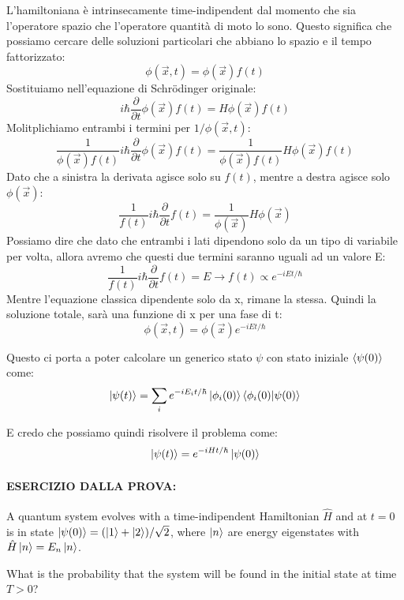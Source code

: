 L'hamiltoniana è intrinsecamente time-indipendent dal momento che sia l'operatore spazio che l'operatore quantità di moto lo sono. Questo significa che possiamo cercare delle soluzioni particolari che abbiano lo spazio e il tempo fattorizzato:
$$\phi(\vec{x}, t) = \phi(\vec{x})f(t)$$
Sostituiamo nell'equazione di Schr\"{o}dinger originale:
$$i\hbar\frac{\partial}{\partial t}\phi(\vec{x})f(t) = H\phi(\vec{x})f(t)$$
Molitplichiamo entrambi i termini per $1 / \phi(\vec{x}, t)$:
$$\frac{1}{\phi(\vec{x})f(t)}i\hbar\frac{\partial}{\partial t}\phi(\vec{x})f(t) = \frac{1}{\phi(\vec{x})f(t)}H\phi(\vec{x})f(t)$$
Dato che a sinistra la derivata agisce solo su $f(t)$, mentre a destra agisce solo $\phi(\vec{x})$:
$$\frac{1}{f(t)}i\hbar\frac{\partial}{\partial t}f(t) = \frac{1}{\phi(\vec{x})}H\phi(\vec{x})$$
Possiamo dire che dato che entrambi i lati dipendono solo da un tipo di variabile per volta, allora avremo che questi due termini saranno uguali ad un valore E:
$$\frac{1}{f(t)}i\hbar\frac{\partial}{\partial t}f(t) = E \longrightarrow f(t) \propto e^{-iEt/\hbar}$$
Mentre l'equazione classica dipendente solo da x, rimane la stessa. Quindi la soluzione totale, sarà una funzione di x per una fase di t:
$$\phi(\vec{x}, t) = \phi(\vec{x})e^{-iEt/\hbar}$$

\noindent Questo ci porta a poter calcolare un generico stato $\psi$ con stato iniziale $\braket{\psi(0)}$ come:
$$\ket{\psi(t)} = \sum_{i}e^{-iE_it/\hbar} \ket{\phi_i(0)} \braket{\phi_i(0)|\psi(0)}$$

\noindent E credo che possiamo quindi risolvere il problema come:
$$\ket{\psi(t)} = e^{-iHt/\hbar}\ket{\psi(0)}$$

\paragraph{ESERCIZIO DALLA PROVA:} A quantum system evolves with a time-indipendent Hamiltonian $\hat{H}$ and at $t = 0$ is in state $\ket{\psi(0)} = (\ket{1} + \ket{2}) / \sqrt{2}$, where $\ket{n}$ are energy eigenstates with $\hat{H}\ket{n} = E_n\ket{n}$.

\noindent What is the probability that the system will be found in the initial state at time $T > 0$?

\vspace{15pt}

